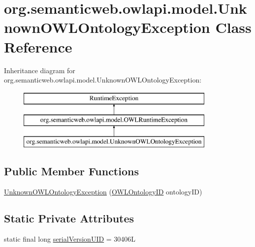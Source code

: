 \hypertarget{classorg_1_1semanticweb_1_1owlapi_1_1model_1_1_unknown_o_w_l_ontology_exception}{\section{org.\-semanticweb.\-owlapi.\-model.\-Unknown\-O\-W\-L\-Ontology\-Exception Class Reference}
\label{classorg_1_1semanticweb_1_1owlapi_1_1model_1_1_unknown_o_w_l_ontology_exception}
}
Inheritance diagram for org.\-semanticweb.\-owlapi.\-model.\-Unknown\-O\-W\-L\-Ontology\-Exception\-:\begin{figure}[H]
\begin{center}
\leavevmode
\includegraphics[height=3.000000cm]{classorg_1_1semanticweb_1_1owlapi_1_1model_1_1_unknown_o_w_l_ontology_exception}
\end{center}
\end{figure}
\subsection*{Public Member Functions}
\begin{DoxyCompactItemize}
\item 
\hyperlink{classorg_1_1semanticweb_1_1owlapi_1_1model_1_1_unknown_o_w_l_ontology_exception_a614360d6675bfa25bb9f05e08985a61a}{Unknown\-O\-W\-L\-Ontology\-Exception} (\hyperlink{classorg_1_1semanticweb_1_1owlapi_1_1model_1_1_o_w_l_ontology_i_d}{O\-W\-L\-Ontology\-I\-D} ontology\-I\-D)
\end{DoxyCompactItemize}
\subsection*{Static Private Attributes}
\begin{DoxyCompactItemize}
\item 
static final long \hyperlink{classorg_1_1semanticweb_1_1owlapi_1_1model_1_1_unknown_o_w_l_ontology_exception_aaf6e0b84d85f9ba46bb02b6161eb9a86}{serial\-Version\-U\-I\-D} = 30406\-L
\end{DoxyCompactItemize}


